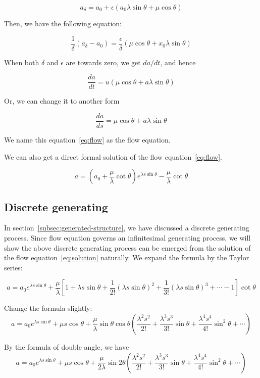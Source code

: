 \documentclass{article}
\numberwithin{definition}{section}
\numberwithin{lemma}{section}
\numberwithin{proposition}{section}
\numberwithin{corollary}{section}
\numberwithin{theorem}{section}
\begin{document}
\[
    a_{\delta} = a_0 + \epsilon (a_0 \lambda \sin \theta + \mu \cos \theta)
\]

Then, we have the following equation:

\[
    \frac{1}{\delta} (a_{\delta} - a_0) = \frac{\epsilon}{\delta} (\mu \cos \theta + x_0 \lambda \sin \theta)
\]

When both $\delta$ and $\epsilon$ are towards zero, we get $da / dt$, and hence

\[
    \frac{da}{dt} = u (\mu \cos \theta + a \lambda \sin \theta)
\]

Or, we can change it to another form

\begin{equation}
    \frac{da}{ds} = \mu \cos \theta + a \lambda \sin \theta\label{eq:flow}
\end{equation}

We name this equation~\eqref{eq:flow} as the flow equation.

We can also get a direct formal solution of the flow equation~\eqref{eq:flow}.

\begin{equation}
    a = (a_0 + \frac{\mu}{\lambda} \cot \theta) e^{\lambda s \sin \theta} - \frac{\mu}{\lambda} \cot \theta\label{eq:solution}
\end{equation}

\subsection{Discrete generating}\label{subsec:discrete-generating}

In section~\ref{subsec:generated-structure}, we have discussed a discrete generating process.
Since flow equation governs an infinitesimal generating process,
we will show the above discrete generating process can be emerged from the solution of the flow equation~\eqref{eq:solution} naturally.
We expand the formula by the Taylor series:

\[
    a =  a_0 e^{\lambda s \sin \theta} + \frac{\mu}{\lambda} [1 + \lambda s \sin \theta + \frac{1}{2!} (\lambda s \sin \theta)^2  + \frac{1}{3!} (\lambda s \sin \theta)^3 + \cdots - 1] \cot \theta
\]

Change the formula slightly:
\[
    a = a_0 e^{\lambda s \sin \theta} + \mu s \cos \theta + \frac{\mu}{\lambda} \sin \theta \cos \theta (\frac{\lambda^2s^2}{2!} + \frac{\lambda^3s^3}{3!} \sin \theta + \frac{\lambda^4s^4}{4!} \sin^2 \theta + \cdots)
\]

By the formula of double angle, we have
\[
    a = a_0 e^{\lambda s \sin \theta} + \mu s \cos \theta + \frac{\mu}{2\lambda} \sin 2\theta (\frac{\lambda^2s^2}{2!} + \frac{\lambda^3s^3}{3!} \sin \theta + \frac{\lambda^4s^4}{4!} \sin^2 \theta + \cdots)
\]
\end{document}
